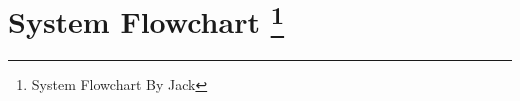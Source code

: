\documentclass[oneside,openany,11pt,a4paper]{report}
\begin{document}
\begin{center}
\end{center}

\section[System Flowchart]{System Flowchart \protect\footnote{System Flowchart By Jack}}
\begin{center}
\end{center}
\end{document}

